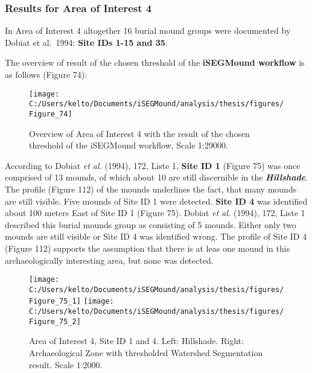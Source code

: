 \documentclass[
  12pt,
]{article}
\begin{document}
\hypertarget{results-for-area-of-interest-4}{%
\subsubsection{\texorpdfstring{\textbf{Results for Area of Interest 4}}{Results for Area of Interest 4}}\label{results-for-area-of-interest-4}}

In Area of Interest 4 altogether 16 burial mound groups were documented by Dobiat et al.~1994: \textbf{Site IDs 1-15 and 35}.

The overview of result of the chosen threshold of the \textbf{iSEGMound workflow} is as follows (Figure 74):

\begin{figure}

{\centering \texttt{[image: C:/Users/kelto/Documents/iSEGMound/analysis/thesis/figures/Figure\_74]} 

}

\caption{Overview of Area of Interest 4 with the result of the chosen threshold of the iSEGMound workflow, Scale 1:29000.}\label{fig:Figure74}
\end{figure}

According to Dobiat \emph{et al.} (1994), 172, Liste 1, \textbf{Site ID 1} (Figure 75) was once comprised of 13 mounds, of which about 10 are still discernible in the \textbf{\emph{Hillshade}}. The profile (Figure 112) of the mounds underlines the fact, that many mounds are still visible. Five mounds of Site ID 1 were detected.
\textbf{Site ID 4} was identified about 100 meters East of Site ID 1 (Figure 75). Dobiat \emph{et al.} (1994), 172, Liste 1 described this burial mounds group as consisting of 5 mounds. Either only two mounds are still visible or Site ID 4 was identified wrong. The profile of Site ID 4 (Figure 112) supports the assumption that there is at leas one mound in this archaeologically interesting area, but none was detected.

\begin{figure}
\texttt{[image: C:/Users/kelto/Documents/iSEGMound/analysis/thesis/figures/Figure\_75\_1]} \texttt{[image: C:/Users/kelto/Documents/iSEGMound/analysis/thesis/figures/Figure\_75\_2]} \caption{Area of Interest 4, Site ID 1 and 4. Left: Hillshade. Right: Archaeological Zone with thresholded Watershed Segmentation result. Scale 1:2000.}\label{fig:Figure75}
\end{figure}
\end{document}
